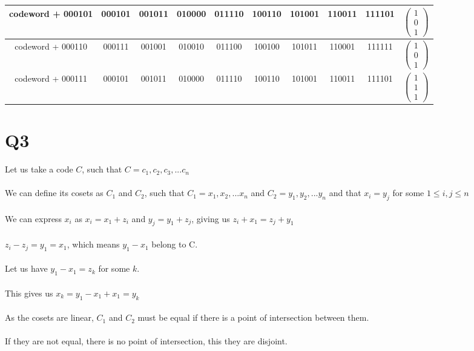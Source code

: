 \documentclass{article}
\begin{document}
\begin{center}
\begin{tabular}{|c|c c c c c c c c |c|}
\hline
codeword + 000101 & 000101 & 001011 & 010000 & 011110 & 100110 & 101001 & 110011 & 111101 & $\begin{pmatrix}1\\0\\1\end{pmatrix}$\\
\hline
codeword + 000110 & 000111 & 001001 & 010010 & 011100 & 100100 & 101011 & 110001 & 111111 & $\begin{pmatrix}1\\0\\1\end{pmatrix}$\\
\hline
codeword + 000111 & 000101 & 001011 & 010000 & 011110 & 100110 & 101001 & 110011 & 111101 & $\begin{pmatrix}1\\1\\1\end{pmatrix}$\\
\hline
\end{tabular}
\end{center}
\section{Q3}
Let us take a code $C$, such that $ C = {c_1,c_2,c_3,...c_n}$\\\\
We can define its cosets as $C_1$ and $C_2$, such that $C_1 = {x_1,x_2,...x_n}$ and $C_2 = {y_1,y_2,...y_n}$ and that $x_i = y_j$ for some $1 \leq i,j \leq n$\\\\
We can express $x_i$ as $x_i = x_1 + z_i$ and $y_j = y_1 + z_j$, giving us $z_i + x_1 = z_j + y_1$\\\\
$z_i - z_j = y_1 = x_1$, which means $y_1 - x_1$ belong to C.\\\\
Let us have $y_1 - x_1 = z_k$ for some $k$. \\\\
This gives us $x_k = y_1 - x_1 + x_1 = y_k$\\\\
As the cosets are linear, $C_1$ and $C_2$ must be equal if there is a point of intersection between them.\\\\
If they are not equal, there is no point of intersection, this they are disjoint.
\end{document}
